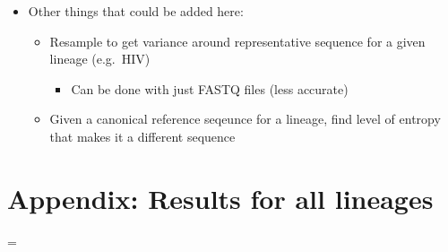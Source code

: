 \documentclass[
]{article}
\providecommand{\tightlist}{%
  \setlength{\itemsep}{0pt}\setlength{\parskip}{0pt}}
\begin{document}
\begin{itemize}
\tightlist
\item
  Other things that could be added here:

  \begin{itemize}
  \tightlist
  \item
    Resample to get variance around representative sequence for a given
    lineage (e.g.~HIV)

    \begin{itemize}
    \tightlist
    \item
      Can be done with just FASTQ files (less accurate)
    \end{itemize}
  \item
    Given a canonical reference seqeunce for a lineage, find level of
    entropy that makes it a different sequence
  \end{itemize}
\end{itemize}

\hypertarget{appendix-results-for-all-lineages}{%
\section{Appendix: Results for all
lineages}\label{appendix-results-for-all-lineages}}

\LTcapwidth=\textwidth

\scriptsize
\end{document}
